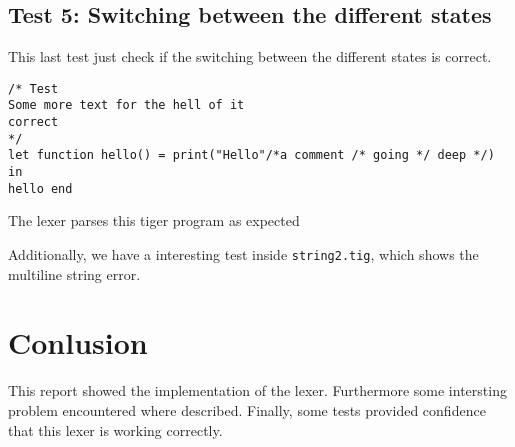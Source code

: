\documentclass{article}
\begin{document}
\subsection{Test 5: Switching between the different states}
This last test just check if the switching between the different states is correct.

\begin{lstlisting}[frame=single]
/* Test 
Some more text for the hell of it
correct
*/
let function hello() = print("Hello"/*a comment /* going */ deep */) in 
hello end
\end{lstlisting}
The lexer parses this tiger program as expected

Additionally, we have a interesting test inside \texttt{string2.tig}, which shows the multiline string error.

\section{Conlusion}
This report showed the implementation of the lexer. Furthermore some intersting problem encountered where described. Finally, some tests provided confidence that this lexer is working correctly.
\end{document}
